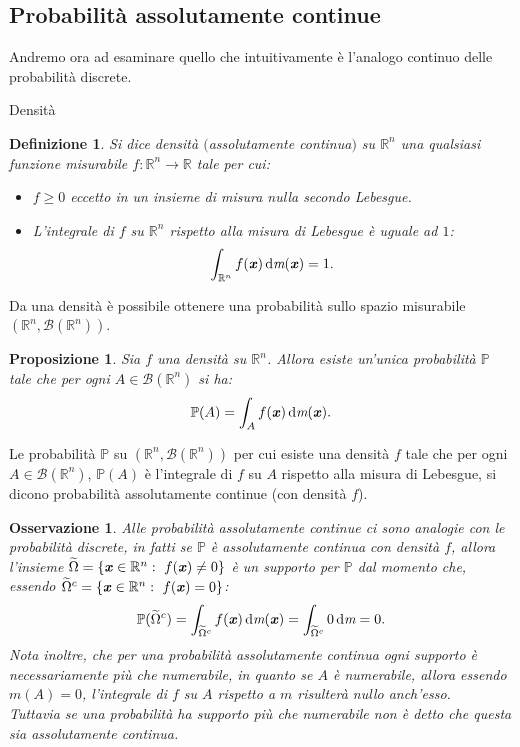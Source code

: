 \documentclass[11pt]{book}
\theoremstyle{Definizione}
\newtheorem*{mydef}{Definizione}
\theoremstyle{TeoremaProposizioneLemmaCorollario}
\newtheorem{mypropo}[myteo]{Proposizione}
\theoremstyle{OsservazioneNota}
\newtheorem{myobs}{Osservazione}[section]
\newcommand{\R}{\mathbb{R}}
\newcommand{\gri}[1]{\textbf{\textit{{#1}}}}
\renewcommand{\P}{\mathbb{P}}
\newcommand{\Borel}{\mathcal{B}}
\renewcommand{\d}{\mathrm{d}}
\newcommand{\dm}{\,\d \textit{m}}
\begin{document}
\subsection{Probabilità assolutamente continue}
Andremo ora ad esaminare quello che intuitivamente è l'analogo continuo delle probabilità discrete.
\begin{boxdef}{Densità}
\begin{mydef}
Si dice densità $($assolutamente continua$)$ su $\R^n$ una qualsiasi funzione misurabile $f: \R^n \longrightarrow \R$ tale per cui:
\begin{itemize}
\item[$(i)$] $f \geq 0$ eccetto in un insieme di misura nulla secondo Lebesgue.
\item[$(ii)$] L'integrale di $f$ su $\R^n$ rispetto alla misura di Lebesgue è uguale ad $1$:
$$
\int_{\R^n} f(\gri{x}) \dm(\gri{x}) = 1.
$$
\end{itemize}
\end{mydef}
\end{boxdef}
\noindent
Da una densità è possibile ottenere una probabilità sullo spazio misurabile $(\R^n,\Borel(\R^n))$.
\begin{boxpro}
\begin{mypropo}
Sia $f$ una densità su $\R^n$. Allora esiste un'unica probabilità $\P$ tale che per ogni $A\in \Borel(\R^n)$ si ha:
$$
\P(A) = \int_A f(\gri{x})\dm(\gri{x}).
$$
\end{mypropo}
\end{boxpro}
\noindent
Le probabilità $\P$ su $(\R^n,\Borel(\R^n))$ per cui esiste una densità $f$ tale che per ogni $A\in \Borel(\R^n)$, $\P(A)$ è l'integrale di $f$ su $A$ rispetto alla misura di Lebesgue, si dicono probabilità assolutamente continue (con densità $f$).
\begin{myobs}
Alle probabilità assolutamente continue ci sono analogie con le probabilità discrete, in fatti se $\P$ è assolutamente continua con densità $f$, allora l'insieme $\widetilde{\Omega} = \{\gri{x}\in \R^n:\ f(\gri{x}) \neq 0\}$ è un supporto per $\P$ dal momento che, essendo $\widetilde{\Omega}^c = \{\gri{x}\in \R^n:\ f(\gri{x}) = 0\}$:
$$
\P(\widetilde{\Omega}^c) = \int_{\widetilde{\Omega}^c} f(\gri{x}) \dm(\gri{x}) = \int_{\widetilde{\Omega}^c} 0 \dm = 0.
$$
Nota inoltre, che per una probabilità assolutamente continua ogni supporto è necessariamente più che numerabile, in quanto se $A$ è numerabile, allora essendo $m(A) = 0$, l'integrale di $f$ su $A$ rispetto a $m$ risulterà nullo anch'esso.\\
Tuttavia se una probabilità ha supporto più che numerabile non è detto che questa sia assolutamente continua.
\end{myobs}
\end{document}
